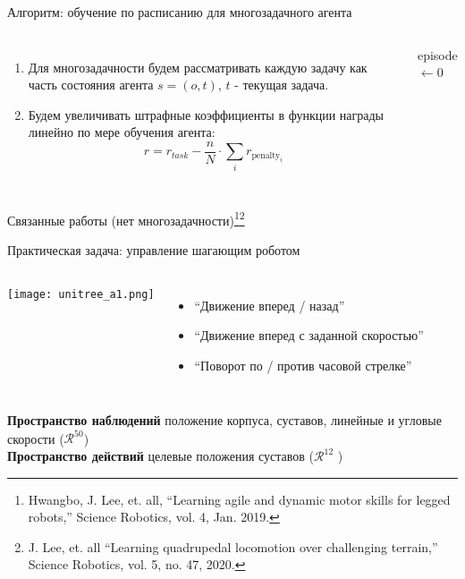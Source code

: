\begin{frame}{Алгоритм: обучение по расписанию для многозадачного агента}

\begin{minipage}{\linewidth}

\begin{columns}
\begin{enumerate}
    \item Для многозадачности будем рассматривать каждую задачу как часть состояния агента $s = (o, t)$, $t$ - текущая задача. 
    \item Будем увеличивать штрафные коэффициенты в функции награды линейно по мере обучения агента:
    \vspace{-10pt}
    \begin{equation*}
        r = r_{task} - \frac{n}{N} \cdot \sum_i r_{\mathrm{penalty}_i}  
    \end{equation*}
\end{enumerate}

\begin{algorithm}[H]
episode $\gets 0$
\end{algorithm}
\end{columns}
\end{minipage}
\begin{minipage}{\linewidth}

\vspace{5pt}
\setcounter{footnote}{0} 
Связанные работы (нет многозадачности)\footnote[frame]{Hwangbo, J. Lee, et. all, “Learning agile and dynamic motor skills for legged robots,” Science Robotics, vol. 4, Jan. 2019.}\footnote[frame]{J. Lee, et. all “Learning quadrupedal locomotion over challenging terrain,” Science Robotics, vol. 5, no. 47, 2020.}
\end{minipage}

    
\end{frame}

\begin{frame}{Практическая задача: управление шагающим роботом}
\begin{columns}
\centering
\texttt{[image: unitree\_a1.png]}
\begin{itemize}
    \item ``Движение вперед / назад''
	\item ``Движение вперед с заданной скоростью''
    \item ``Поворот по / против часовой стрелке''
\end{itemize}
\end{columns}
\textbf{Пространство наблюдений} положение корпуса, суставов, линейные и угловые скорости ($\mathcal{R}^{50}$) 
\\
\textbf{Пространство действий} целевые положения суставов ($\mathcal{R}^{12}$ )

\end{frame}

